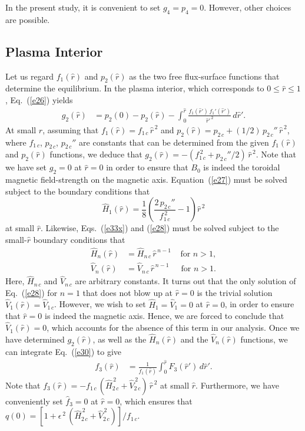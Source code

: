 \documentclass[12pt,prb,aps]{revtex4-1}
\begin{document}
In the present study, it is convenient to set $g_4=p_4=0$. However, other choices are possible. 

\subsection{Plasma Interior}
Let us regard $f_1(\hat{r})$ and $p_2(\hat{r})$ as the two free flux-surface functions that
determine the equilibrium. In the plasma interior, which corresponds to $0\leq\hat{r}\leq 1$, Eq.~(\ref{e26}) yields
\begin{align}
g_2(\hat{r}) &=p_2(0)-p_2(\hat{r}) - \int_0^{\hat{r}}\frac{f_1(\hat{r}')\,f_1'(\hat{r}')}{\hat{r}'^{\,2}}\,d\hat{r}'.\label{e35x}
\end{align}
At small $\hat{r}$, assuming that $f_1(\hat{r})=f_{1\,c}\,\hat{r}^{\,2}$ and $p_2(\hat{r})=p_{2\,c}+(1/2)\,p_{2\,c}''\,\hat{r}^{\,2}$, where $f_{1\,c}$, $p_{2\,c}$,  $p_{2\,c}''$
are constants that can be determined from the given $f_1(\hat{r})$ and $p_2(\hat{r})$ functions, 
we deduce that $g_2(\hat{r}) = -(f_{1\,c}^{\,2}+p_{2\,c}''/2)\,\hat{r}^{\,2}$. Note that we have set $g_2=0$ at $\hat{r}=0$ in order to ensure that $B_0$ is
indeed the toroidal magnetic field-strength on the magnetic axis.
Equation~(\ref{e27}) must be solved subject to the boundary conditions that
\begin{equation}\label{e38vv}
\hat{H}_1(\hat{r}) = \frac{1}{8}\left(\frac{2\,p_{2\,c}''}{f_{1\,c}^{\,2}}-1\right)\hat{r}^{\,2}
\end{equation}
at small $\hat{r}$.  Likewise, Eqs.~(\ref{e33x}) and (\ref{e28}) must be solved subject to the small-$\hat{r}$ boundary conditions that 
\begin{align}
\hat{H}_n(\hat{r}) &= \hat{H}_{n\,c}\,\hat{r}^{\,n-1}~~~~~\mbox{for $n>1$},\\[0.5ex]
\hat{V}_n(\hat{r}) &= \hat{V}_{n\,c}\,\hat{r}^{\,n-1}~~~~~\,\,\mbox{for $n>1$}.\label{e40vv}
\end{align}
Here, $\hat{H}_{n\,c}$ and $\hat{V}_{n\,c}$ are  arbitrary constants. It turns out that the only solution of Eq.~(\ref{e28}) for $n=1$ that does not
blow up at $\hat{r}=0$ is the trivial solution
$\hat{V}_1(\hat{r}) = \hat{V}_{1\,c}$.
However, we wish to set $\hat{H}_1=\hat{V}_1=0$ at $\hat{r}=0$, in
order to ensure that $\hat{r}=0$ is indeed the magnetic axis. Hence, we are forced to conclude that
$\hat{V}_1(\hat{r}) = 0$, which accounts for the absence of this term in our analysis. 
Once we have determined $g_2(\hat{r})$,  as well as the $\hat{H}_n(\hat{r})$ and the $\hat{V}_n(\hat{r})$ functions, we can integrate Eq.~(\ref{e30}) to give 
\begin{align}
f_3(\hat{r})&= \frac{1}{f_1(\hat{r})}\int _0^{\hat{r}}F_3(\hat{r}')\,d\hat{r}'.\label{e36x}
\end{align}
Note that $f_3(\hat{r})=-f_{1\,c}\,(\hat{H}_{2\,c}^{\,2}+\hat{V}_{2\,c}^{\,2})\,\hat{r}^{\,2}$ at small $\hat{r}$. Furthermore, we
have conveniently set $\hat{f}_3=0$ at $\hat{r}=0$, which ensures that $q(0)= [1+\epsilon^{\,2}\,(\hat{H}_{2\,c}^{\,2}+\hat{V}_{2\,c}^{\,2})]/f_{1\,c}$. 
\end{document}
